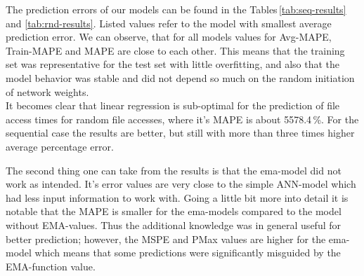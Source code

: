 \documentclass{superfri}
\begin{document}
The prediction errors of our models can be found in the Tables\,\ref{tab:seq-results} and \ref{tab:rnd-results}.
Listed values refer to the model with smallest average prediction error.
We can observe, that for all models values for Avg-MAPE, Train-MAPE and MAPE are close to each other.
This means that the training set was representative for the test set with little overfitting, and also that the model behavior was stable and did not depend so much on the random initiation of network weights.
\\
It becomes clear that linear regression is sub-optimal for the prediction of file access times for random file accesses, where it's MAPE is about 5578.4\,\%. For the sequential case the results are better, but still with more than three times higher average percentage error.\medskip

The second thing one can take from the results is that the ema-model did not work as intended.
It's error values are very close to the simple ANN-model which had less input information to work with.
Going a little bit more into detail it is notable that the MAPE is smaller for the ema-models compared to the model without EMA-values.
Thus the additional knowledge was in general useful for better prediction; however, the MSPE and PMax values are higher for the ema-model which means that some predictions were significantly misguided by the EMA-function value.\medskip
\end{document}
